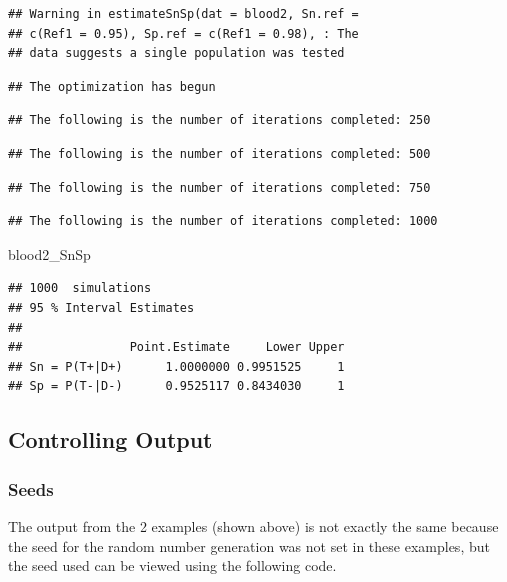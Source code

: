 \documentclass[
  12pt,
]{article}
\newenvironment{Shaded}{\begin{snugshade}}{\end{snugshade}}
\newcommand{\NormalTok}[1]{#1}
\begin{document}
\begin{verbatim}
## Warning in estimateSnSp(dat = blood2, Sn.ref =
## c(Ref1 = 0.95), Sp.ref = c(Ref1 = 0.98), : The
## data suggests a single population was tested
\end{verbatim}

\begin{verbatim}
## The optimization has begun
\end{verbatim}

\begin{verbatim}
## The following is the number of iterations completed: 250
\end{verbatim}

\begin{verbatim}
## The following is the number of iterations completed: 500
\end{verbatim}

\begin{verbatim}
## The following is the number of iterations completed: 750
\end{verbatim}

\begin{verbatim}
## The following is the number of iterations completed: 1000
\end{verbatim}

\begin{Shaded}
\begin{Highlighting}[]
\NormalTok{blood2\_SnSp}
\end{Highlighting}
\end{Shaded}

\begin{verbatim}
## 1000  simulations 
## 95 % Interval Estimates
## 
##               Point.Estimate     Lower Upper
## Sn = P(T+|D+)      1.0000000 0.9951525     1
## Sp = P(T-|D-)      0.9525117 0.8434030     1
\end{verbatim}

\subsection{Controlling Output}\label{controlling-output}

\subsubsection{Seeds}\label{seeds}

The output from the 2 examples (shown above) is not exactly the same
because the seed for the random number generation was not set in these
examples, but the seed used can be viewed using the following code.
\end{document}
